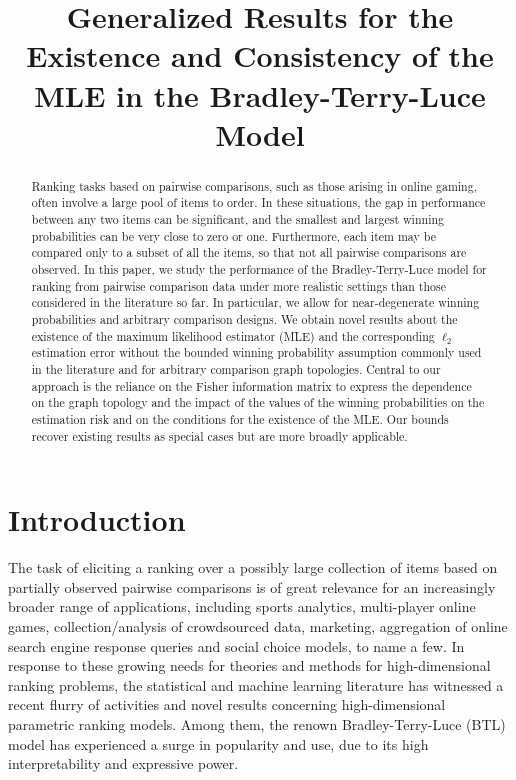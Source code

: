 \title{Generalized Results for the Existence and Consistency of the MLE in the Bradley-Terry-Luce Model}

\begin{abstract}
Ranking tasks based on pairwise comparisons, such as those arising in online gaming, often involve a large pool of items to order.  In these situations, the gap in performance between any two items can be significant, and the smallest and largest winning probabilities can be very close to zero or one. Furthermore, each item may be compared only to a subset of all the items, so that not all pairwise comparisons are observed. In this paper, we study the performance of the Bradley-Terry-Luce model for ranking from pairwise comparison data under more realistic settings than those considered in the literature so far. In particular, we allow for near-degenerate winning probabilities and arbitrary comparison designs. We obtain novel results about the existence of the  maximum likelihood estimator (MLE) and the corresponding $\ell_2$ estimation error without the bounded winning probability assumption commonly used in the literature and for arbitrary comparison graph topologies. Central to our approach is the reliance on the Fisher information matrix to express the dependence on the graph topology and the impact of the values of the winning probabilities on the estimation risk and on the conditions for the existence of the MLE. Our bounds recover existing results as special cases but are more broadly applicable.
\end{abstract}

\section{Introduction} \label{sec:introduction}
The task of eliciting a ranking over a possibly large collection of items based on partially observed pairwise comparisons is of great relevance for an increasingly broader range of applications, including sports analytics, multi-player online games, collection/analysis of crowdsourced data, marketing, aggregation of online search engine response queries and social choice models, to name a few. In response to these growing needs for theories and methods for high-dimensional ranking problems, the statistical and machine learning literature has witnessed a recent flurry of activities and novel results concerning high-dimensional parametric ranking models. Among them, the renown Bradley-Terry-Luce (BTL) model \citep{bradley1952rank,luce2012individual} has experienced a surge in popularity and use, due to its high interpretability and expressive power. 

